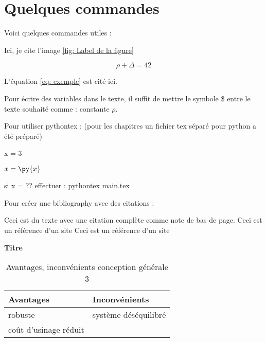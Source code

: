 
\section{Quelques commandes}

Voici quelques commandes utiles :


Ici, je cite l'image \ref{fig: Label de la figure}



\begin{equation} \label{eq: exemple}
\rho + \Delta = 42
\end{equation}

L'équation \ref{eq: exemple} est cité ici. 


Pour écrire des variables dans le texte, il suffit de mettre le symbole \$ entre le texte souhaité comme : constante $\rho$.

Pour utiliser pythontex : (pour les chapitres un fichier tex séparé pour python a été préparé)
\begin{pycode}
x = 3
\end{pycode}
       
$x = \py{x}$

si x = ?? effectuer :
pythontex main.tex


Pour créer une bibliography avec des citations :

Ceci est du texte avec une citation complète comme note de bas de page.
Ceci est un référence d'un site 
Ceci est un référence d'un site 

\begin{table}[H]
    \centering
    \textbf{Titre}

    \vspace{0.3cm}
    \begin{tabular}{|l|l|}
    \hline
    Avantages & Inconvénients \\ \hline
      robuste        &   système déséquilibré  \\ \hline
       coût d'usinage réduit       &     \\ \hline
    \end{tabular}
    \caption{Avantages, inconvénients conception générale 3}
    \label{tab:idGen3}
    \end{table}